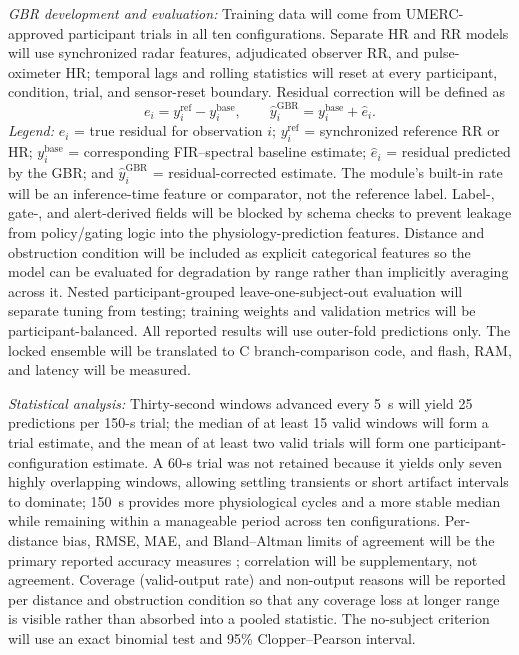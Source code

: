 \documentclass[10pt,conference]{IEEEtran}
\begin{document}
\textit{GBR development and evaluation:} Training data will come from UMERC-approved participant trials in all ten configurations. Separate HR and RR models will use synchronized radar features, adjudicated observer RR, and pulse-oximeter HR; temporal lags and rolling statistics will reset at every participant, condition, trial, and sensor-reset boundary. Residual correction will be defined as
\begin{equation}
 e_i=y_i^{\mathrm{ref}}-y_i^{\mathrm{base}},\qquad
 \hat y_i^{\mathrm{GBR}}=y_i^{\mathrm{base}}+\hat e_i.
\end{equation}
\noindent\emph{Legend:} $e_i$ = true residual for observation $i$; $y_i^{\mathrm{ref}}$ = synchronized reference RR or HR; $y_i^{\mathrm{base}}$ = corresponding FIR--spectral baseline estimate; $\hat e_i$ = residual predicted by the GBR; and $\hat y_i^{\mathrm{GBR}}$ = residual-corrected estimate. The module's built-in rate will be an inference-time feature or comparator, not the reference label. Label-, gate-, and alert-derived fields will be blocked by schema checks to prevent leakage from policy/gating logic into the physiology-prediction features. Distance and obstruction condition will be included as explicit categorical features so the model can be evaluated for degradation by range rather than implicitly averaging across it. Nested participant-grouped leave-one-subject-out evaluation will separate tuning from testing; training weights and validation metrics will be participant-balanced. All reported results will use outer-fold predictions only. The locked ensemble will be translated to C branch-comparison code, and flash, RAM, and latency will be measured.

\textit{Statistical analysis:} Thirty-second windows advanced every 5~s will yield 25 predictions per 150-s trial; the median of at least 15 valid windows will form a trial estimate, and the mean of at least two valid trials will form one participant-configuration estimate. A 60-s trial was not retained because it yields only seven highly overlapping windows, allowing settling transients or short artifact intervals to dominate; 150~s provides more physiological cycles and a more stable median while remaining within a manageable period across ten configurations. Per-distance bias, RMSE, MAE, and Bland--Altman limits of agreement will be the primary reported accuracy measures \cite{bland1986,blandaltman2007,addison2024}; correlation will be supplementary, not agreement. Coverage (valid-output rate) and non-output reasons will be reported per distance and obstruction condition so that any coverage loss at longer range is visible rather than absorbed into a pooled statistic. The no-subject criterion will use an exact binomial test and 95\% Clopper--Pearson interval.
\end{document}
